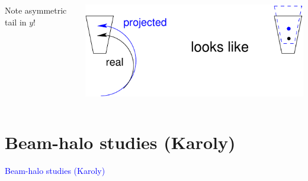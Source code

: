 \documentclass[compress]{beamer}
\begin{document}
\begin{frame}
\begin{columns}
\vspace{0.2 cm}
Note asymmetric tail in $y$!

\vspace{-0.4 cm}
\begin{center}
\includegraphics[width=0.8\linewidth]{momentum_y_explanation.pdf}
\end{center}
\end{columns}
\end{frame}

\section*{Beam-halo studies (Karoly)}

\begin{frame}
\begin{center}
\Huge \textcolor{blue}{Beam-halo studies (Karoly)}
\end{center}
\end{frame}
\end{document}
